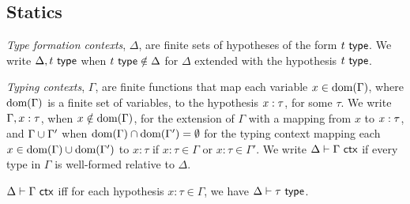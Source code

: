 
\subsection{Statics}
\emph{Type formation contexts}, $\Delta$, are finite sets of hypotheses of the form $t~\mathsf{type}$. We write $\Delta, t~\mathsf{type}$ when $t~\mathsf{type} \notin \Delta$ for $\Delta$ extended with the hypothesis $t~\mathsf{type}$. %

\emph{Typing contexts}, $\Gamma$, are finite functions that map each variable $x \in \text{dom}(\Gamma)$, where $\text{dom}(\Gamma)$ is a finite set of variables, to the hypothesis $x : \tau$, for some $\tau$. We write $\Gamma, x : \tau$, when $x \notin \text{dom}(\Gamma)$, for the extension of $\Gamma$ with a mapping from $x$ to $x : \tau$, and ${\Gamma}\cup{\Gamma'}$ when $\text{dom}(\Gamma) \cap \text{dom}(\Gamma') = \emptyset$ for the typing context mapping each $x \in \text{dom}(\Gamma) \cup \text{dom}(\Gamma')$ to $x : \tau$ if $x : \tau \in \Gamma$ or $x : \tau \in \Gamma'$. We write $\Delta \vdash \Gamma~\mathsf{ctx}$ if every type in $\Gamma$ is well-formed relative to $\Delta$.
\begin{definition} \label{def:isctxU}
$\Delta \vdash \Gamma~\mathsf{ctx}$ iff for each hypothesis $x : \tau \in \Gamma$, we have $\Delta \vdash \tau~\mathsf{type}$.
\end{definition}

